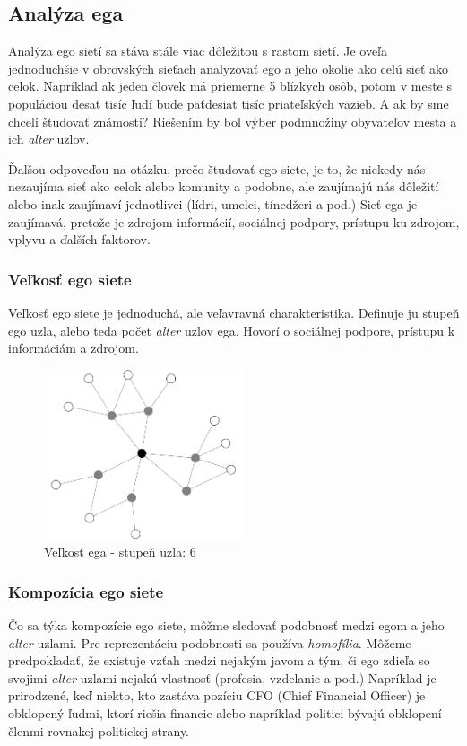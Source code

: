 \documentclass[slovak,master,public,dept460,male,cpdeclaration,oneside]{diploma}
\begin{document}
\subsection{Analýza ega}
Analýza ego sietí sa stáva stále viac dôležitou s rastom sietí. Je oveľa jednoduchšie v obrovských sieťach analyzovať ego a jeho okolie ako celú sieť ako celok. Napríklad ak jeden človek má priemerne 5 blízkych osôb, potom v meste s populáciou desať tisíc ľudí bude päťdesiat tisíc priateľských väzieb. A ak by sme chceli študovať známosti? Riešením by bol výber podmnožiny obyvateľov mesta a ich \textit{alter} uzlov.


Ďalšou odpoveďou na otázku, prečo študovať ego siete, je to, že niekedy nás nezaujíma sieť ako celok alebo komunity a podobne, ale zaujímajú nás dôležití alebo inak zaujímaví jednotlivci (lídri, umelci, tínedžeri a pod.) Sieť ega je zaujímavá, pretože je zdrojom informácií, sociálnej podpory, prístupu ku zdrojom, vplyvu a ďalších faktorov.

\subsubsection{Veľkosť ego siete}
Veľkosť ego siete je jednoduchá, ale veľavravná charakteristika. Definuje ju stupeň ego uzla, alebo teda počet \textit{alter} uzlov ega. Hovorí o sociálnej podpore, prístupu k informáciám a zdrojom.


\begin{figure}[H]
\centering
\includegraphics[width=6cm, height=5cm]{figures/egonet}
\caption{Veľkosť ega - stupeň uzla: 6}
\end{figure}

\subsubsection{Kompozícia ego siete}
Čo sa týka kompozície ego siete, môžme sledovať podobnosť medzi egom a jeho \textit{alter} uzlami. Pre reprezentáciu podobnosti sa používa \textit{homofília}. Môžeme predpokladať, že existuje vzťah medzi nejakým javom a tým, či ego zdieľa so svojimi \textit{alter} uzlami nejakú vlastnosť (profesia, vzdelanie a pod.) Napríklad je prirodzené, keď niekto, kto zastáva pozíciu CFO (Chief Financial Officer) je obklopený ľudmi, ktorí riešia financie alebo napríklad politici bývajú obklopení členmi rovnakej politickej strany. 
\end{document}
